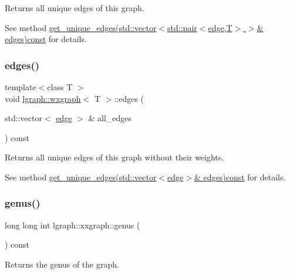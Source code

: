 Returns all unique edges of this graph. 

See method \hyperlink{classlgraph_1_1wugraph_af0172a57b7e544029b849f096811c36f}{get\+\_\+unique\+\_\+edges(std\+::vector$<$std\+::pair$<$edge,\+T$>$ $>$\& edges)const} for details. \mbox{\label{classlgraph_1_1wxgraph_ae99b335ca0cc70f619ae7c186d2dc7ac}} 
\subsubsection{\texorpdfstring{edges()}{edges()}\hspace{0.1cm}{\footnotesize\ttfamily [2/2]}}
{\footnotesize\ttfamily template$<$class T $>$ \\
void \hyperlink{classlgraph_1_1wxgraph}{lgraph\+::wxgraph}$<$ T $>$\+::edges (\begin{DoxyParamCaption}\item[{std\+::vector$<$ \hyperlink{namespacelgraph_a76bd7d50719f03de7a85db259d80d572}{edge} $>$ \&}]{all\+\_\+edges }\end{DoxyParamCaption}) const\hspace{0.3cm}{\ttfamily [inherited]}}



Returns all unique edges of this graph without their weights. 

See method \hyperlink{classlgraph_1_1wugraph_a455d1df8d3799b70a23b5b9944cbafb7}{get\+\_\+unique\+\_\+edges(std\+::vector$<$edge$>$\& edges)const} for details. \mbox{\label{classlgraph_1_1xxgraph_a5f48a91046766e3e0b71a3326f2b9153}} 
\subsubsection{\texorpdfstring{genus()}{genus()}}
{\footnotesize\ttfamily long long int lgraph\+::xxgraph\+::genus (\begin{DoxyParamCaption}{ }\end{DoxyParamCaption}) const\hspace{0.3cm}{\ttfamily [inherited]}}



Returns the genus of the graph. 

